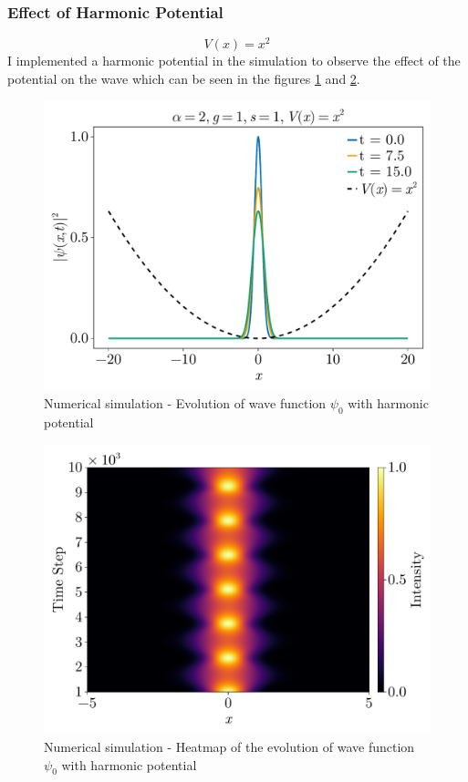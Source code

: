 \documentclass[8pt, a4paper, twocolumn]{article}
\begin{document}
\subsubsection{Effect of Harmonic Potential}
\begin{equation}
	V(x) = x^2
\end{equation}
I implemented a harmonic potential in the simulation to observe the effect of the potential on the 
wave which can be seen in the figures \ref{fig:nlse_evolution_harmonic} and 
\ref{fig:nlse_heatmap_harmonic}.
\begin{figure}[h!]
	\centering
	\includegraphics[width=\linewidth]{../figs/nlse_evolution_harmonic.pdf}
	\caption{Numerical simulation - Evolution of wave function $\psi_0$ with harmonic potential}
	\label{fig:nlse_evolution_harmonic}
\end{figure}
\begin{figure}[h!]
	\centering
	\includegraphics[width=\linewidth]{../figs/nlse_heatmap_harmonic.pdf}
	\caption{Numerical simulation - Heatmap of the evolution of wave function $\psi_0$ with harmonic potential}
	\label{fig:nlse_heatmap_harmonic}
\end{figure}
\end{document}
